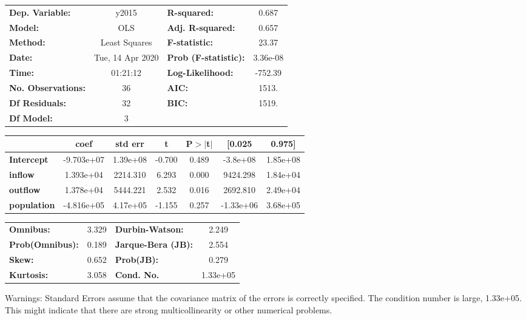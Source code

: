 \begin{center}
\begin{tabular}{lclc}
\toprule
\textbf{Dep. Variable:}    &      y2015       & \textbf{  R-squared:         } &     0.687   \\
\textbf{Model:}            &       OLS        & \textbf{  Adj. R-squared:    } &     0.657   \\
\textbf{Method:}           &  Least Squares   & \textbf{  F-statistic:       } &     23.37   \\
\textbf{Date:}             & Tue, 14 Apr 2020 & \textbf{  Prob (F-statistic):} &  3.36e-08   \\
\textbf{Time:}             &     01:21:12     & \textbf{  Log-Likelihood:    } &   -752.39   \\
\textbf{No. Observations:} &          36      & \textbf{  AIC:               } &     1513.   \\
\textbf{Df Residuals:}     &          32      & \textbf{  BIC:               } &     1519.   \\
\textbf{Df Model:}         &           3      & \textbf{                     } &             \\
\bottomrule
\end{tabular}
\begin{tabular}{lcccccc}
                    & \textbf{coef} & \textbf{std err} & \textbf{t} & \textbf{P$> |$t$|$} & \textbf{[0.025} & \textbf{0.975]}  \\
\midrule
\textbf{Intercept}  &   -9.703e+07  &     1.39e+08     &    -0.700  &         0.489        &     -3.8e+08    &     1.85e+08     \\
\textbf{inflow}     &    1.393e+04  &     2214.310     &     6.293  &         0.000        &     9424.298    &     1.84e+04     \\
\textbf{outflow}    &    1.378e+04  &     5444.221     &     2.532  &         0.016        &     2692.810    &     2.49e+04     \\
\textbf{population} &   -4.816e+05  &     4.17e+05     &    -1.155  &         0.257        &    -1.33e+06    &     3.68e+05     \\
\bottomrule
\end{tabular}
\begin{tabular}{lclc}
\textbf{Omnibus:}       &  3.329 & \textbf{  Durbin-Watson:     } &    2.249  \\
\textbf{Prob(Omnibus):} &  0.189 & \textbf{  Jarque-Bera (JB):  } &    2.554  \\
\textbf{Skew:}          &  0.652 & \textbf{  Prob(JB):          } &    0.279  \\
\textbf{Kurtosis:}      &  3.058 & \textbf{  Cond. No.          } & 1.33e+05  \\
\bottomrule
\end{tabular}
\end{center}

Warnings: \newline
 [1] Standard Errors assume that the covariance matrix of the errors is correctly specified. \newline
 [2] The condition number is large, 1.33e+05. This might indicate that there are \newline
 strong multicollinearity or other numerical problems.